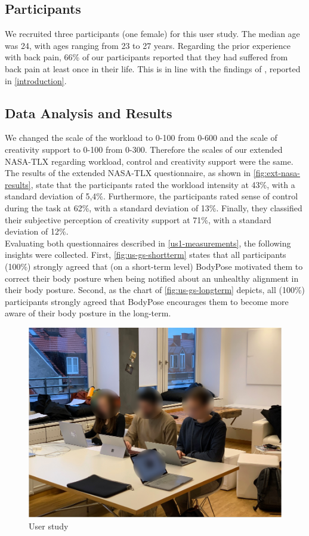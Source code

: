 \subsection{Participants}
\label{us1-participants}
We recruited three participants (one female) for this user study. The median age was 24, with ages ranging from 23 to 27 years. Regarding the prior experience with back pain, 66\% of our participants reported that they had suffered from back pain at least once in their life. This is in line with the findings of \cite{osha2000facts}, reported in \autoref{introduction}.

\subsection{Data Analysis and Results}
\label{us1-data-analysis-results}
We changed the scale of the workload to 0-100 from 0-600 and the scale of creativity support to 0-100 from 0-300. Therefore the scales of our extended NASA-TLX regarding workload, control and creativity support were the same. The results of the extended NASA-TLX questionnaire, as shown in \autoref{fig:ext-nasa-results}, state that the participants rated the workload intensity at 43\%, with a standard deviation of 5,4\%. Furthermore, the participants rated sense of control during the task at 62\%, with a standard deviation of 13\%. Finally, they classified their subjective perception of creativity support at 71\%, with a standard deviation of 12\%.\\
Evaluating both questionnaires described in \autoref{us1-measurements}, the following insights were collected. First, \autoref{fig:us-gs-shortterm} states that all participants (100\%) strongly agreed that (on a short-term level) BodyPose motivated them to correct their body posture when being notified about an unhealthy alignment in their body posture.
Second, as the chart of \autoref{fig:us-gs-longterm} depicts, all (100\%) participants strongly agreed that BodyPose encourages them to become more aware of their body posture in the long-term.

\begin{figure}[htpb]
\centering
  \includegraphics[width=\linewidth]{media/user-study-1.png}
  \caption{User study}
  \label{fig:user-study-1}
\end{figure}

